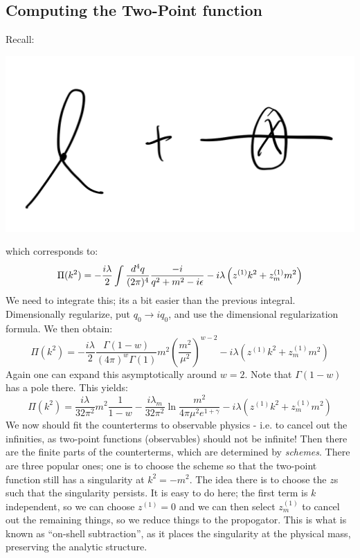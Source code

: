 \subsection{Computing the Two-Point function}
Recall:
\begin{center}
    \includegraphics[scale=0.5]{Images/fig-lec29feynman5.png}
\end{center}
which corresponds to:
\begin{equation}
    \Pi(k^2) = -\frac{i\lambda}{2}\int \frac{d^4q}{(2\pi)^4} \frac{-i}{q^2 + m^2 - i\epsilon} - i\lambda \left(z^{(1)}k^2 + z^{(1)}_m m^2\right)
\end{equation}
We need to integrate this; its a bit easier than the previous integral. Dimensionally regularize, put $q_0 \to iq_0$, and use the dimensional regularization formula. We then obtain:
\begin{equation}
    \Pi(k^2) = -\frac{i\lambda}{2}\frac{\Gamma(1 - w)}{(4\pi)^w \Gamma(1)}m^2\left(\frac{m^2}{\mu^2}\right)^{w-2} - i\lambda\left(z^{(1)}k^2 + z^{(1)}_m m^2\right)
\end{equation}
Again one can expand this asymptotically around $w = 2$. Note that $\Gamma(1 - w)$ has a pole there. This yields:
\begin{equation}
    \Pi(k^2) =  \frac{i\lambda}{32\pi^2}m^2\frac{1}{1-w} - \frac{i\lambda_m}{32\pi^2}\ln\frac{m^2}{4\pi \mu^2 e^{1+\gamma}} - i\lambda\left(z^{(1)}k^2 + z^{(1)}_m m^2\right)
\end{equation}
We now should fit the counterterms to observable physics - i.e. to cancel out the infinities, as two-point functions (observables) should not be infinite! Then there are the finite parts of the counterterms, which are determined by \emph{schemes}. There are three popular ones; one is to choose the scheme so that the two-point function still has a singularity at $k^2 = -m^2$. The idea there is to choose the $z$s such that the singularity persists. It is easy to do here; the first term is $k$ independent, so we can choose $z^{(1)} = 0$ and we can then select $z^{(1)}_m$ to cancel out the remaining things, so we reduce things to the propogator. This is what is known as ``on-shell subtraction'', as it places the singularity at the physical mass, preserving the analytic structure.

